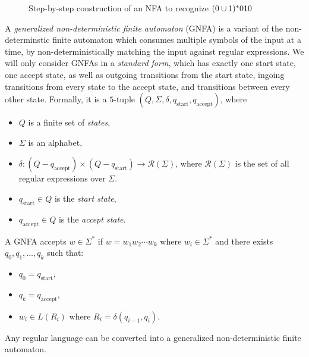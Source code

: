 \begin{exmp}
\begin{figure}[ht!]
        \caption{Step-by-step construction of an NFA to recognize $(0 \cup 1)^{*}010$}
        \label{fig:regex-nfa-construction-example}
    \end{figure}
\end{exmp}

\begin{defn}
    A \emph{generalized non-deterministic finite automaton} (GNFA) is a variant of the non-determinstic finite automaton which consumes multiple symbols of the input at a time, by non-deterministically matching the input against regular expressions. We will only consider GNFAs in a \emph{standard form}, which has exactly one start state, one accept state, as well as outgoing transitions from the start state, ingoing transitions from every state to the accept state, and transitions between every other state. Formally, it is a $5$-tuple $(Q, \Sigma, \delta, q_{\textrm{start}}, q_{\textrm{accept}})$, where
    \begin{itemize}
        \item $Q$ is a finite set of \emph{states},
        \item $\Sigma$ is an alphabet,
        \item $\delta: (Q - q_{\textrm{accept}}) \times \left(Q - q_{\textrm{start}}\right) \to \mathcal{R}(\Sigma)$, where $\mathcal{R}(\Sigma)$ is the set of all regular expressions over $\Sigma$.
        \item $q_{\textrm{start}} \in Q$ is the \emph{start state},
        \item $q_{\textrm{accept}} \in Q$ is the \emph{accept state}.
    \end{itemize}

    A GNFA accepts $w \in \Sigma^{*}$ if $w = w_1w_2\cdots w_k$ where $w_i \in \Sigma^{*}$ and there exists $q_0, q_1, \ldots, q_k$ such that:
    \begin{itemize}
        \item $q_0 = q_{\textrm{start}}$,
        \item $q_k = q_{\textrm{accept}}$,
        \item $w_i \in L(R_i)$ where $R_i = \delta\left(q_{i-1}, q_i\right)$.
    \end{itemize}
\end{defn}

\begin{lemma}\label{dfa-to-gnfa}
    Any regular language can be converted into a generalized non-deterministic finite automaton.
\end{lemma}


